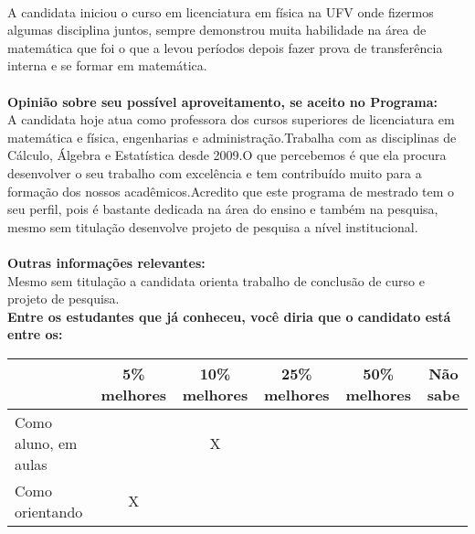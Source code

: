 \documentclass[11pt]{article}
\begin{document}
\\A candidata iniciou o curso em licenciatura em física na UFV onde fizermos algumas disciplina juntos, sempre demonstrou muita habilidade  na área de matemática que foi o que a  levou períodos depois fazer prova de transferência interna e se formar em matemática.\\
\\
\textbf{Opinião sobre seu possível aproveitamento, se aceito no Programa:}
\\A candidata hoje atua como professora dos cursos superiores de licenciatura em matemática e física, engenharias e administração.Trabalha com as disciplinas de Cálculo, Álgebra e Estatística desde 2009.O que percebemos é que ela procura desenvolver o seu trabalho com excelência e tem contribuído  muito para a formação dos nossos acadêmicos.Acredito que este programa de mestrado tem o seu perfil, pois é bastante dedicada na área do ensino e também na pesquisa, mesmo sem titulação desenvolve projeto de pesquisa a nível institucional.\\ 
\\
\textbf{Outras informações relevantes:} \\Mesmo sem titulação a candidata orienta trabalho de conclusão de curso e projeto de pesquisa.
\\[0.3cm]
\textbf{Entre os estudantes que já conheceu, você diria que o candidato está entre os:}
\\
\begin{tabular}{|l|c|c|c|c|c|}
\hline
 & 5\% melhores & 10\% melhores & 25\% melhores & 50\% melhores & Não sabe \\
\hline
Como aluno, em aulas &  & X &  &  & \\
\hline
Como orientando & X &  &  &  & \\
\hline
\end{tabular}
\end{document}
